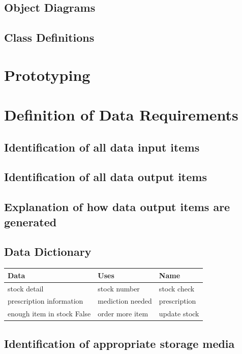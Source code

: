 \subsection{Object Diagrams}

\subsection{Class Definitions}

\section{Prototyping}

\section{Definition of Data Requirements}

\subsection{Identification of all data input items}

\subsection{Identification of all data output items}

\subsection{Explanation of how data output items are generated}

\subsection{Data Dictionary}
\begin{table}[H]
\begin{tabular}{|l|l|l|}
\hline
Data & Uses & Name \\
\hline
stock detail & stock number & stock check\\
\hline
prescription information & mediction needed & prescription\\
\hline
enough item in stock False & order more item & update stock\\
\hline
\end{tabular}
\end{table}

\subsection{Identification of appropriate storage media}

